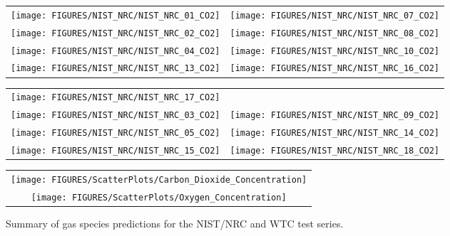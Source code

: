 \begin{figure}[p]
\begin{tabular*}{\textwidth}{l@{\extracolsep{\fill}}r}
\texttt{[image: FIGURES/NIST\_NRC/NIST\_NRC\_01\_CO2]} &
\texttt{[image: FIGURES/NIST\_NRC/NIST\_NRC\_07\_CO2]} \\
\texttt{[image: FIGURES/NIST\_NRC/NIST\_NRC\_02\_CO2]} &
\texttt{[image: FIGURES/NIST\_NRC/NIST\_NRC\_08\_CO2]} \\
\texttt{[image: FIGURES/NIST\_NRC/NIST\_NRC\_04\_CO2]} &
\texttt{[image: FIGURES/NIST\_NRC/NIST\_NRC\_10\_CO2]} \\
\texttt{[image: FIGURES/NIST\_NRC/NIST\_NRC\_13\_CO2]} &
\texttt{[image: FIGURES/NIST\_NRC/NIST\_NRC\_16\_CO2]}
\end{tabular*}
\end{figure}

\begin{figure}[p]
\begin{tabular*}{\textwidth}{l@{\extracolsep{\fill}}r}
\texttt{[image: FIGURES/NIST\_NRC/NIST\_NRC\_17\_CO2]} &
 \\
\texttt{[image: FIGURES/NIST\_NRC/NIST\_NRC\_03\_CO2]} &
\texttt{[image: FIGURES/NIST\_NRC/NIST\_NRC\_09\_CO2]} \\
\texttt{[image: FIGURES/NIST\_NRC/NIST\_NRC\_05\_CO2]} &
\texttt{[image: FIGURES/NIST\_NRC/NIST\_NRC\_14\_CO2]} \\
\texttt{[image: FIGURES/NIST\_NRC/NIST\_NRC\_15\_CO2]} &
\texttt{[image: FIGURES/NIST\_NRC/NIST\_NRC\_18\_CO2]}
\end{tabular*}
\end{figure}


\begin{figure}[p]
\begin{center}
\begin{tabular}{c}
\texttt{[image: FIGURES/ScatterPlots/Carbon\_Dioxide\_Concentration]} \\
\texttt{[image: FIGURES/ScatterPlots/Oxygen\_Concentration]}\\
\end{tabular}
\end{center}
\caption[Summary of gas species predictions, NIST/NRC and WTC test series.]
{Summary of gas species predictions for the NIST/NRC and WTC test series.}
\end{figure}

